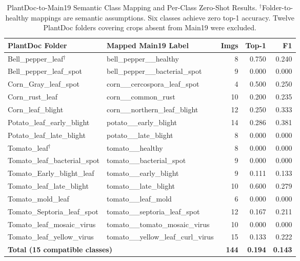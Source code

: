 \documentclass[conference]{IEEEtran}
\begin{document}
\begin{table}[!t]
\caption{PlantDoc-to-Main19 Semantic Class Mapping and Per-Class
Zero-Shot Results. $^\dagger$Folder-to-healthy mappings are semantic
assumptions. Six classes achieve zero top-1 accuracy. Twelve PlantDoc
folders covering crops absent from Main19 were excluded.}
\label{tab:plantdoc_perclass}
\centering
\small
\setlength{\tabcolsep}{5pt}
\renewcommand{\arraystretch}{1.12}
\begin{tabular}{llrrr}
\toprule
\textbf{PlantDoc Folder} & \textbf{Mapped Main19 Label} & \textbf{Imgs} & \textbf{Top-1} & \textbf{F1} \\
\midrule
Bell\_pepper\_leaf$^\dagger$ & bell\_pepper\_\_healthy & 8 & 0.750 & 0.240 \\
Bell\_pepper\_leaf\_spot & bell\_pepper\_\_bacterial\_spot & 9 & 0.000 & 0.000 \\
Corn\_Gray\_leaf\_spot & corn\_\_cercospora\_leaf\_spot & 4 & 0.500 & 0.250 \\
Corn\_rust\_leaf & corn\_\_common\_rust & 10 & 0.200 & 0.235 \\
Corn\_leaf\_blight & corn\_\_northern\_leaf\_blight & 12 & 0.250 & 0.333 \\
Potato\_leaf\_early\_blight & potato\_\_early\_blight & 14 & 0.286 & 0.381 \\
Potato\_leaf\_late\_blight & potato\_\_late\_blight & 8 & 0.000 & 0.000 \\
Tomato\_leaf$^\dagger$ & tomato\_\_healthy & 8 & 0.000 & 0.000 \\
Tomato\_leaf\_bacterial\_spot & tomato\_\_bacterial\_spot & 9 & 0.000 & 0.000 \\
Tomato\_Early\_blight\_leaf & tomato\_\_early\_blight & 9 & 0.111 & 0.133 \\
Tomato\_leaf\_late\_blight & tomato\_\_late\_blight & 10 & 0.600 & 0.279 \\
Tomato\_mold\_leaf & tomato\_\_leaf\_mold & 6 & 0.000 & 0.000 \\
Tomato\_Septoria\_leaf\_spot & tomato\_\_septoria\_leaf\_spot & 12 & 0.167 & 0.211 \\
Tomato\_leaf\_mosaic\_virus & tomato\_\_tomato\_mosaic\_virus & 10 & 0.000 & 0.000 \\
Tomato\_leaf\_yellow\_virus & tomato\_\_yellow\_leaf\_curl\_virus & 15 & 0.133 & 0.222 \\
\midrule
\multicolumn{2}{l}{\textbf{Total (15 compatible classes)}} & \textbf{144} & \textbf{0.194} & \textbf{0.143} \\
\bottomrule
\end{tabular}
\end{table}
\end{document}
